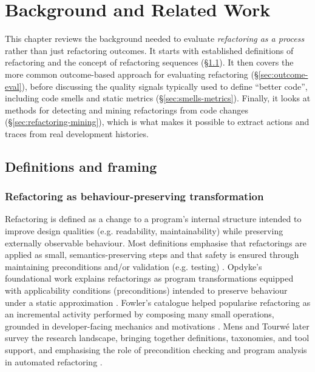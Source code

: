 \chapter{Background and Related Work}
\label{ch:background}

This chapter reviews the background needed to evaluate \emph{refactoring as a process} rather than just refactoring outcomes. It starts with established definitions of refactoring and the concept of refactoring sequences (\S\ref{sec:def-framing}). It then covers the more common outcome-based approach for evaluating refactoring (\S\ref{sec:outcome-eval}), before discussing the quality signals typically used to define ``better code'', including code smells and static metrics (\S\ref{sec:smells-metrics}). Finally, it looks at methods for detecting and mining refactorings from code changes (\S\ref{sec:refactoring-mining}), which is what makes it possible to extract actions and traces from real development histories.

\section{Definitions and framing}
\label{sec:def-framing}

\subsection{Refactoring as behaviour-preserving transformation}
Refactoring is defined as a change to a program's internal structure intended to improve design qualities (e.g. readability, maintainability) while preserving externally observable behaviour. Most definitions emphasise that refactorings are applied as small, semantics-preserving steps and that safety is ensured through maintaining preconditions and/or validation (e.g. testing) \cite{opdyke1992refactoring,fowler1999refactoring,fowler2018refactoring}. Opdyke's foundational work explains refactorings as program transformations equipped with applicability conditions (preconditions) intended to preserve behaviour under a static approximation \cite{opdyke1992refactoring}. Fowler's catalogue helped popularise refactoring as an incremental activity performed by composing many small operations, grounded in developer-facing mechanics and motivations \cite{fowler1999refactoring,fowler2018refactoring}. Mens and Tourw\'e later survey the research landscape, bringing together definitions, taxonomies, and tool support, and emphasising the role of precondition checking and program analysis in automated refactoring \cite{mens2004survey}.

